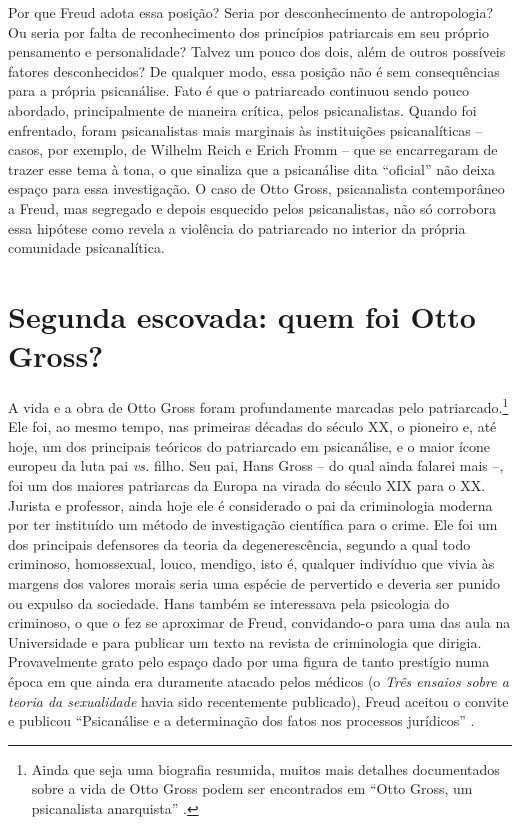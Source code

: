 Por que Freud adota essa posição? Seria por desconhecimento de
antropologia? Ou seria por falta de reconhecimento dos princípios
patriarcais em seu próprio pensamento e personalidade? Talvez um pouco
dos dois, além de outros possíveis fatores desconhecidos? De qualquer
modo, essa posição não é sem consequências para a própria psicanálise.
Fato é que o patriarcado continuou sendo pouco abordado, principalmente
de maneira crítica, pelos psicanalistas. Quando foi enfrentado, foram
psicanalistas mais marginais às instituições psicanalíticas -- casos,
por exemplo, de Wilhelm Reich e Erich Fromm -- que se encarregaram de
trazer esse tema à tona, o que sinaliza que a psicanálise dita
``oficial'' não deixa espaço para essa investigação. O caso de Otto
Gross, psicanalista contemporâneo a Freud, mas segregado e depois
esquecido pelos psicanalistas, não só corrobora essa hipótese como
revela a violência do patriarcado no interior da própria comunidade
psicanalítica.

\section{Segunda escovada: quem foi Otto Gross? }

A vida e a obra de Otto Gross foram profundamente marcadas pelo
patriarcado.\footnote{Ainda que seja uma biografia resumida, muitos mais
  detalhes documentados sobre a vida de Otto Gross podem ser encontrados
  em ``Otto Gross, um psicanalista anarquista'' .} Ele foi, ao mesmo
tempo, nas primeiras décadas do século XX, o pioneiro e, até hoje, um
dos principais teóricos do patriarcado em psicanálise, e o maior ícone
europeu da luta pai \emph{vs.} filho. Seu pai, Hans Gross -- do qual
ainda falarei mais --, foi um dos maiores patriarcas da Europa na virada
do século XIX para o XX. Jurista e professor, ainda hoje ele é
considerado o pai da criminologia moderna por ter instituído um método
de investigação científica para o crime. Ele foi um dos principais
defensores da teoria da degenerescência, segundo a qual todo criminoso,
homossexual, louco, mendigo, isto é, qualquer indivíduo que vivia às
margens dos valores morais seria uma espécie de pervertido e deveria ser
punido ou expulso da sociedade. Hans também se interessava pela
psicologia do criminoso, o que o fez se aproximar de Freud, convidando-o
para uma das aula na Universidade e para publicar um texto na revista de
criminologia que dirigia. Provavelmente grato pelo espaço dado por uma
figura de tanto prestígio numa época em que ainda era duramente atacado
pelos médicos (o \emph{Três ensaios sobre a teoria da sexualidade} havia
sido recentemente publicado), Freud aceitou o convite e publicou
``Psicanálise e a determinação dos fatos nos processos jurídicos'' .

